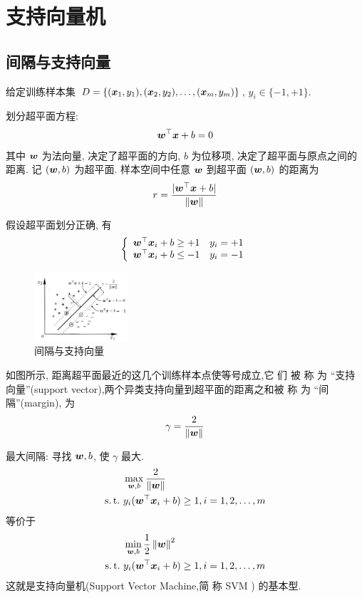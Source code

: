 \newpage
\section{支持向量机}

\subsection{间隔与支持向量}
给定训练样本集 $D=\{ (\bm{x}_1, y_1), (\bm{x}_2,y_2),\dots,(\bm{x}_m,y_m) \}$, $y_i\in\{ -1,+1 \}$. 

划分超平面方程:
\begin{align*}
    \bm{w}^\top \bm{x}+b=0
\end{align*}
其中 $\bm{w}$ 为法向量, 决定了超平面的方向, $b$ 为位移项, 决定了超平面与原点之间的距离. 记 $(\bm{w},b)$ 为超平面. 样本空间中任意 $\bm{w}$ 到超平面 $(\bm{w},b)$ 的距离为
\begin{align*}
    r=\frac{|\bm{w}^\top\bm{x}+b|}{\left\lVert\bm{w}\right\rVert}
\end{align*}

假设超平面划分正确, 有 
\begin{align*}
    \left\{ \begin{array}{ll}
        \bm{w}^\top \bm{x}_i+b\ge +1 & y_i=+1\\
        \bm{w}^\top \bm{x}_i+b\le -1 & y_i=-1\\
    \end{array} \right.
\end{align*}

\begin{figure}[!htb]
    \centering
    \includegraphics[width=0.309\textwidth]{pic/ML6/间隔与支持向量}
    \caption{间隔与支持向量}
\end{figure}

如图所示, 距离超平面最近的这几个训练样本点使等号成立,它 们 被 称 为 “支持向量”(support vector),两个异类支持向量到超平面的距离之和被 称 为 “间隔”(margin), 为
\begin{align*}
    \gamma=\frac{2}{\left\lVert\bm{w}\right\rVert}
\end{align*}

最大间隔: 寻找 $\bm{w},b$, 使 $\gamma$ 最大. 
\begin{align*}
    &\max_{\bw,b}\frac{2}{\norm{\bw}}\\
    \st& y_i(\bw^\top \bx_i+b)\ge 1,i=1,2,\dots,m
\end{align*}
等价于
\begin{align*}
    &\min_{\bw,b}\frac{1}{2}\norm{\bw}^2\\
    \st& y_i(\bw^\top \bx_i+b)\ge 1,i=1,2,\dots,m
\end{align*}
这就是支持向量机(Support Vector Machine,简 称 SVM ) 的基本型.

